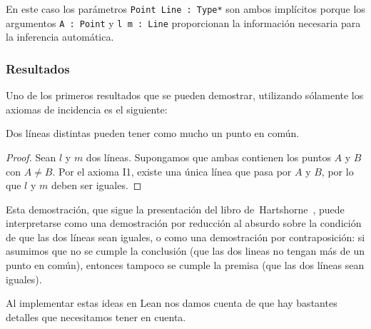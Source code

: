 En este caso los parámetros \lstinline{Point Line : Type*} son ambos implícitos
porque los argumentos \lstinline{A : Point} y \lstinline{l m : Line}
proporcionan la información necesaria para la inferencia automática.\\


\subsubsection{Resultados}

Uno de los primeros resultados que se pueden demostrar, utilizando sólamente los
axiomas de incidencia es el siguiente:

\begin{prop}
	Dos líneas distintas pueden tener como mucho un punto en común.
\end{prop}

\begin{proof}
	Sean $l$ y $m$ dos líneas. Supongamos que ambas contienen los puntos $A$ y
	$B$ con $A\ne B$. Por el axioma I1, existe una única línea que pasa por $A$
	y $B$, por lo que $l$ y $m$ deben ser iguales.
\end{proof}

Esta demostración, que sigue la presentación del libro
de~Hartshorne~\cite{hartshorneGeometryEuclid2000}, puede interpretarse
como una demostración por reducción al absurdo sobre la condición de que las dos
líneas sean iguales, o como una demostración por contraposición: si asumimos que
no se cumple la conclusión (que las dos lineas no tengan más de un punto en
común), entonces tampoco se cumple la premisa (que las dos líneas sean iguales).

Al implementar estas ideas en Lean nos damos cuenta de que hay bastantes
detalles que necesitamos tener en cuenta.


